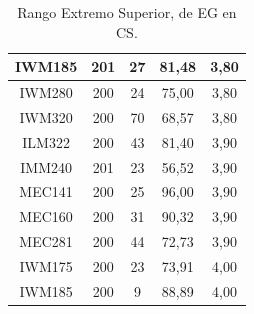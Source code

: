 \documentclass[12pt]{article}
\begin{document}
\begin{table}[H]
{{\begin{minipage}[b]{.5\hsize}
\begin{tabular}{|c|c|c|c|c|}
            IWM185 & 201 & 27 & 81,48 & 3,80 \\ \hline
            \rowcolor[HTML]{DAEBFB} 
            IWM280 & 200 & 24 & 75,00 & 3,80 \\ \hline
            \rowcolor[HTML]{DAEBFB} 
            IWM320 & 200 & 70 & 68,57 & 3,80 \\ \hline
            \rowcolor[HTML]{DAEBFB} 
            ILM322 & 200 & 43 & 81,40 & 3,90 \\ \hline
            \rowcolor[HTML]{DAEBFB} 
            IMM240 & 201 & 23 & 56,52 & 3,90 \\ \hline
            \rowcolor[HTML]{DAEBFB} 
            MEC141 & 200 & 25 & 96,00 & 3,90 \\ \hline
            \rowcolor[HTML]{DAEBFB} 
            MEC160 & 200 & 31 & 90,32 & 3,90 \\ \hline
            \rowcolor[HTML]{DAEBFB} 
            MEC281 & 200 & 44 & 72,73 & 3,90 \\ \hline
            \rowcolor[HTML]{DAEBFB} 
            IWM175 & 200 & 23 & 73,91 & 4,00 \\ \hline
            \rowcolor[HTML]{DAEBFB} 
            IWM185 & 200 & 9 & 88,89 & 4,00 \\ \hline
        \end{tabular}
        \caption{Rango Extremo Superior, de EG en CS.}
    \end{minipage}\hfil
    \hfill
    \begin{minipage}[b]{.5\hsize}\centering
\end{minipage}}}
\end{table}
\end{document}

